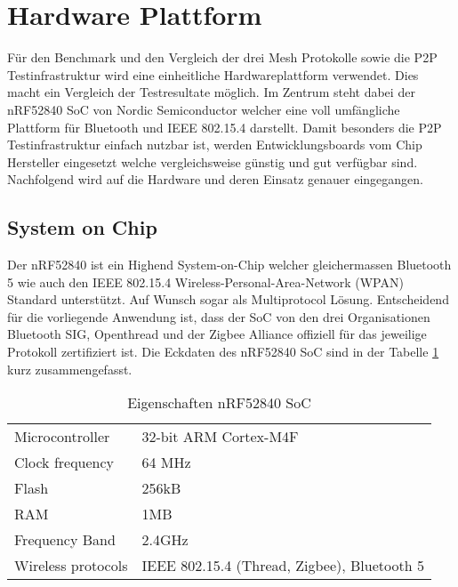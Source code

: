 \clearpage
\section{Hardware Plattform}\label{sec:HardwarePlattform}


Für den Benchmark und den Vergleich der drei Mesh Protokolle sowie die P2P Testinfrastruktur wird eine einheitliche Hardwareplattform verwendet. Dies macht ein Vergleich der Testresultate möglich. Im Zentrum steht dabei der nRF52840 SoC von Nordic Semiconductor welcher eine voll umfängliche Plattform für Bluetooth und IEEE 802.15.4 darstellt. Damit besonders die P2P Testinfrastruktur einfach nutzbar ist, werden Entwicklungsboards vom Chip Hersteller eingesetzt welche vergleichsweise günstig und gut verfügbar sind. Nachfolgend wird auf die Hardware und deren Einsatz genauer eingegangen.


\subsection{System on Chip}\label{subsec:SystemonChip}

Der nRF52840 ist ein Highend System-on-Chip welcher gleichermassen Bluetooth 5 wie auch den IEEE 802.15.4 Wireless-Personal-Area-Network (WPAN) Standard unterstützt. Auf Wunsch sogar als Multiprotocol Lösung.
Entscheidend für die vorliegende Anwendung ist, dass der SoC von den drei Organisationen Bluetooth SIG, Openthread und der Zigbee Alliance offiziell für das jeweilige Protokoll zertifiziert ist.
Die Eckdaten des nRF52840 SoC sind in der Tabelle \ref{tab:EigenschaftennRF52840SoC} kurz zusammengefasst.

\begin{table}[h]
\centering
\begin{tabular}{ll}
\toprule
Microcontroller    & 32-bit ARM Cortex-M4F                        \\
Clock frequency    & 64 MHz                                       \\
Flash              & 256kB                                        \\
RAM                & 1MB                                          \\
Frequency Band     & 2.4GHz                                       \\
Wireless protocols & IEEE 802.15.4 (Thread, Zigbee), Bluetooth 5  \\
\bottomrule
\end{tabular}
\caption{Eigenschaften nRF52840 SoC \cite{nordic_semiconductor_asa_nrf52840_2020}}
\label{tab:EigenschaftennRF52840SoC}
\end{table}


